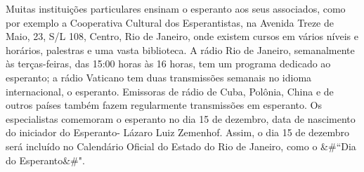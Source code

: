 \documentclass[10pt]{article}
\begin{document}
Muitas instituições particulares ensinam o esperanto aos seus associados, como por exemplo a Cooperativa Cultural dos Esperantistas, na Avenida Treze de Maio, 23, S/L 108, Centro, Rio de Janeiro, onde existem cursos em vários níveis e horários, palestras e uma vasta biblioteca.
A rádio Rio de Janeiro, semanalmente às terças-feiras, das 15:00 horas às 16 horas, tem um programa dedicado ao esperanto; a rádio Vaticano tem duas transmissões semanais no idioma internacional, o esperanto.
Emissoras de rádio de Cuba, Polônia, China e de outros países também fazem regularmente transmissões em esperanto.
Os especialistas comemoram o esperanto no dia 15 de dezembro, data de nascimento do iniciador do Esperanto- Lázaro Luiz Zemenhof.
Assim, o dia 15 de dezembro será incluído no Calendário Oficial do Estado do Rio de Janeiro, como o &#``Dia do Esperanto&#".



\iffalse
\begin{center}
  \textbf{REFERÊNCIAS}
\end{center}


\fi
\end{document}
